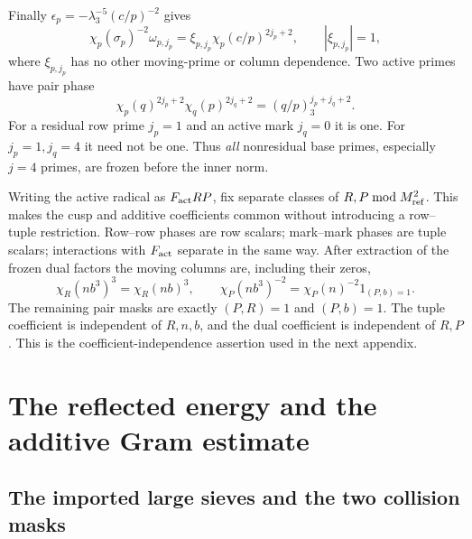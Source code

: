 \documentclass[12pt]{article}
\begin{document}
Finally \(\epsilon_p=-\lambda_3^{-5}(c/p)^{-2}\) gives
\[
 \chi_p(\sigma_p)^{-2}\omega_{p,j_p}
       =\xi_{p,j_p}\chi_p(c/p)^{2j_p+2},\qquad|\xi_{p,j_p}|=1 ,
\]
where \(\xi_{p,j_p}\) has no other moving-prime or column
dependence.  Two active primes have pair phase
\[
 \chi_p(q)^{2j_p+2}\chi_q(p)^{2j_q+2}
                      =(q/p)_3^{j_p+j_q+2}.
 \tag{B16}\label{eq:pair-phase-proof}
\]
For a residual row prime \(j_p=1\) and an active mark \(j_q=0\)
it is one.  For \(j_p=1,j_q=4\) it need not be one.
Thus \emph{all} nonresidual base primes, especially \(j=4\)
primes, are frozen before the inner norm.

Writing the active radical as \(F_{\rm act}RP\), fix separate
classes of \(R,P\bmod M_{\rm ref}^2\).
This makes the cusp and additive coefficients common without
introducing a row--tuple restriction.
Row--row phases are row scalars; mark--mark phases are tuple
scalars; interactions with \(F_{\rm act}\) separate in the same
way.  After extraction of the frozen dual factors the moving
columns are, including their zeros,
\[
 \chi_R(nb^3)^3=\chi_R(nb)^3,\qquad
 \chi_P(nb^3)^{-2}=\chi_P(n)^{-2}1_{(P,b)=1}.
\]
The remaining pair masks are exactly \((P,R)=1\) and \((P,b)=1\).
The tuple coefficient is independent of \(R,n,b\), and the
dual coefficient is independent of \(R,P\).
This is the coefficient-independence assertion used in the next appendix.

\section{The reflected energy and the additive Gram estimate}\label{app:energy}

\subsection{The imported large sieves and the two collision masks}
\end{document}
